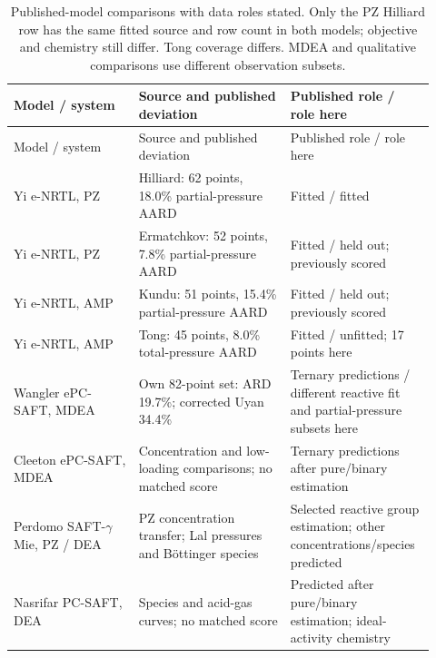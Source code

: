 \begin{longtable}{@{}>{\raggedright\arraybackslash}p{0.29\linewidth}>{\raggedright\arraybackslash}p{0.34\linewidth}>{\raggedright\arraybackslash}p{0.29\linewidth}@{}}
\caption{Published-model comparisons with data roles stated. Only the PZ Hilliard row has the same fitted source and row count in both models; objective and chemistry still differ. Tong coverage differs. MDEA and qualitative comparisons use different observation subsets.}\label{tab:p2-published-comparisons}\\
\toprule Model / system & Source and published deviation & Published role / role here \\ \midrule\endfirsthead
\toprule Model / system & Source and published deviation & Published role / role here \\ \midrule\endhead
\bottomrule\endfoot
Yi e-NRTL, PZ \cite[Table~3]{yiOpenAccessThermodynamically2024} & Hilliard: 62 points, 18.0\% partial-pressure AARD & Fitted / fitted \\
Yi e-NRTL, PZ \cite[Table~3]{yiOpenAccessThermodynamically2024} & Ermatchkov: 52 points, 7.8\% partial-pressure AARD & Fitted / held out; previously scored \\
Yi e-NRTL, AMP \cite[Table~4]{yiOpenAccessThermodynamically2024} & Kundu: 51 points, 15.4\% partial-pressure AARD & Fitted / held out; previously scored \\
Yi e-NRTL, AMP \cite[Table~4]{yiOpenAccessThermodynamically2024} & Tong: 45 points, 8.0\% total-pressure AARD & Fitted / unfitted; 17 points here \\
Wangler ePC-SAFT, MDEA \cite[Table~11]{Wangler2018} & Own 82-point set: ARD 19.7\%; corrected Uyan 34.4\% & Ternary predictions / different reactive fit and partial-pressure subsets here \\
Cleeton ePC-SAFT, MDEA \cite[Sect.~3.3.2]{Cleeton2020} & Concentration and low-loading comparisons; no matched score & Ternary predictions after pure/binary estimation \\
Perdomo SAFT-$\gamma$ Mie, PZ / DEA \cite[Sects.~4.2, 4.3.3]{perdomoPredictiveGroupcontributionFramework2023} & PZ concentration transfer; Lal pressures and Böttinger species & Selected reactive group estimation; other concentrations/species predicted \\
Nasrifar PC-SAFT, DEA \cite[Sect.~6, Figs.~13--14]{Nasrifar2010} & Species and acid-gas curves; no matched score & Predicted after pure/binary estimation; ideal-activity chemistry \\
\end{longtable}\endgroup
